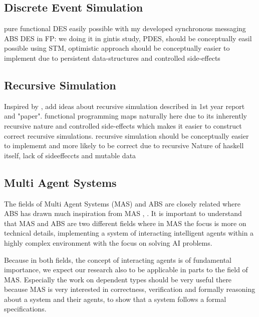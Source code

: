 \subsection{Discrete Event Simulation}
pure functional DES easily possible with my developed synchronous messaging ABS
DES in FP: we doing it in gintis study, 
PDES, should be  conceptually easil possible using STM, optimistic approach should be conceptually easier to implement due to persistent data-structures and controlled side-effects
 
\subsection{Recursive Simulation}
Inspired by \cite{gilmer_recursive_2000}, add ideas about recursive simulation described in 1st year report and "paper". functional programming maps naturally here due to its inherently recursive nature and controlled side-effects which makes it easier to construct correct recursive simulations.
recursive simulation should be conceptually easier to implememt and more likely to be correct due to recursive Nature of haskell itself, lack of sideeffeccts and mutable data

\subsection{Multi Agent Systems}
The fields of Multi Agent Systems (MAS) and ABS are closely related where ABS has drawn much inspiration from MAS \cite{wooldridge_introduction_2009}, \cite{weiss_multiagent_2013}. It is important to understand that MAS and ABS are two different fields where in MAS the focus is more on technical details, implementing a system of interacting intelligent agents within a highly complex environment with the focus on solving AI problems.

Because in both fields, the concept of interacting agents is of fundamental importance, we expect our research also to be applicable in parts to the field of MAS. Especially the work on dependent types should be very useful there because MAS is very interested in correctness, verification and formally reasoning about a system and their agents, to show that a system follows a formal specifications.

